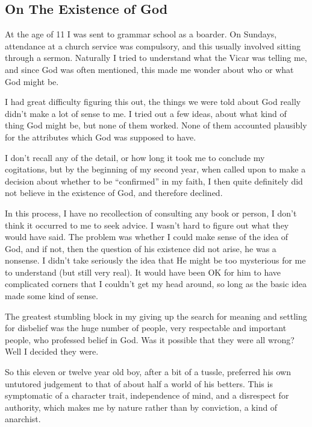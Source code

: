 
\subsection{On The Existence of God}

At the age of 11 I was sent to grammar school as a boarder.
On Sundays, attendance at a church service was compulsory, and this usually involved sitting through a sermon.
Naturally I tried to understand what the Vicar was telling me, and since God was often mentioned, this made me wonder about who or what God might be.

I had great difficulty figuring this out, the things we were told about God really didn't make a lot of sense to me.
I tried out a few ideas, about what kind of thing God might be, but none of them worked.
None of them accounted plausibly for the attributes which God was supposed to have.

I don't recall any of the detail, or how long it took me to conclude my cogitations, but by the beginning of my second year, when called upon to make a decision about whether to be ``confirmed'' in my faith, I then quite definitely did not believe in the existence of God, and therefore declined.

In this process, I have no recollection of consulting any book or person, I don't think it occurred to me to seek advice.
I wasn't hard to figure out what they would have said.
The problem was whether I could make sense of the idea of God, and if not, then the question of his existence did not arise, he was a nonsense.
I didn't take seriously the idea that He might be too mysterious for me to understand (but still very real).
It would have been OK for him to have complicated corners that I couldn't get my head around, so long as the basic idea made some kind of sense.

The greatest stumbling block in my giving up the search for meaning and settling for disbelief was the huge number of people, very respectable and important people, who professed belief in God.
Was it possible that they were all wrong?
Well I decided they were.

So this eleven or twelve year old boy, after a bit of a tussle, preferred his own untutored judgement to that of about half a world of his betters.
This is symptomatic of a character trait, independence of mind, and a disrespect for authority, which makes me by nature rather than by conviction, a kind of anarchist.

